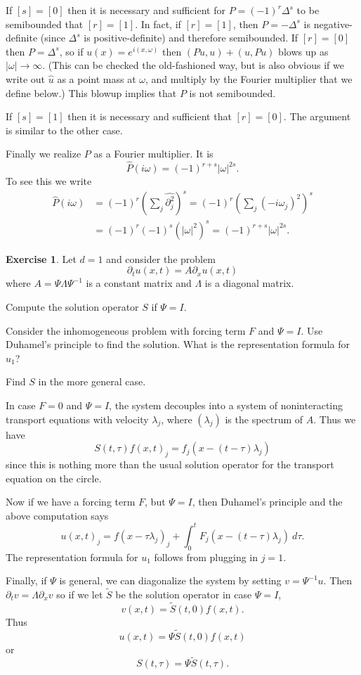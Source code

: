 \documentclass[10pt]{article}
\theoremstyle{definition}
\newtheorem{exer}{Exercise}
\begin{document}
If $[s] = [0]$ then it is necessary and sufficient for $P = (-1)^r \Delta^s$ to be semibounded that $[r] = [1]$.
In fact, if $[r] = [1]$, then $P = -\Delta^s$ is negative-definite (since $\Delta^s$ is positive-definite) and therefore semibounded.
If $[r] = [0]$ then $P = \Delta^s$, so if $u(x) = e^{i(x, \omega)}$ then $(Pu, u) + (u, Pu)$ blows up as $|\omega| \to \infty$.
(This can be checked the old-fashioned way, but is also obvious if we write out $\hat u$ as a point mass at $\omega$, and multiply by the Fourier multiplier that we define below.)
This blowup implies that $P$ is not semibounded.

If $[s] = [1]$ then it is necessary and sufficient that $[r] = [0]$.
The argument is similar to the other case.

Finally we realize $P$ as a Fourier multiplier.
It is
$$\hat P(i\omega) = (-1)^{r + s} |\omega|^{2s}.$$
To see this we write
\begin{align*}
\hat P(i\omega) &= (-1)^r \left(\sum_j \widehat{\partial_j^2}\right)^s = (-1)^r \left(\sum_j (-i\omega_j)^2 \right)^s\\
&= (-1)^r (-1)^s (|\omega|^2)^s = (-1)^{r + s} |\omega|^{2s}.
\end{align*}

\begin{exer}
Let $d = 1$ and consider the problem
$$\partial_t u(x, t) = A\partial_x u(x, t)$$
where $A = \Psi \Lambda \Psi^{-1}$ is a constant matrix and $\Lambda$ is a diagonal matrix.

Compute the solution operator $S$ if $\Psi = I$.

Consider the inhomogeneous problem with forcing term $F$ and $\Psi = I$.
Use Duhamel's principle to find the solution. What is the representation formula for $u_1$?

Find $S$ in the more general case.
\end{exer}

In case $F = 0$ and $\Psi = I$, the system decouples into a system of noninteracting transport equations with velocity $\lambda_j$, where $(\lambda_j)$ is the spectrum of $A$.
Thus we have
$$S(t, \tau)f(x, t)_j = f_j(x - (t - \tau)\lambda_j)$$
since this is nothing more than the usual solution operator for the transport equation on the circle.

Now if we have a forcing term $F$, but $\Psi = I$, then Duhamel's principle and the above computation says
$$u(x, t)_j = f(x - \tau \lambda_j)_j + \int_0^t F_j(x - (t - \tau)\lambda_j) ~d\tau.$$
The representation formula for $u_1$ follows from plugging in $j = 1$.

Finally, if $\Psi$ is general, we can diagonalize the system by setting $v = \Psi^{-1} u$.
Then $\partial_t v = \Lambda \partial_x v$ so if we let $\tilde S$ be the solution operator in case $\Psi = I$,
$$v(x, t) = \tilde S(t, 0) f(x, t).$$
Thus
$$u(x, t) = \Psi \tilde S(t, 0) f(x, t)$$
or
$$S(t, \tau) = \Psi \tilde S(t, \tau).$$
\end{document}
